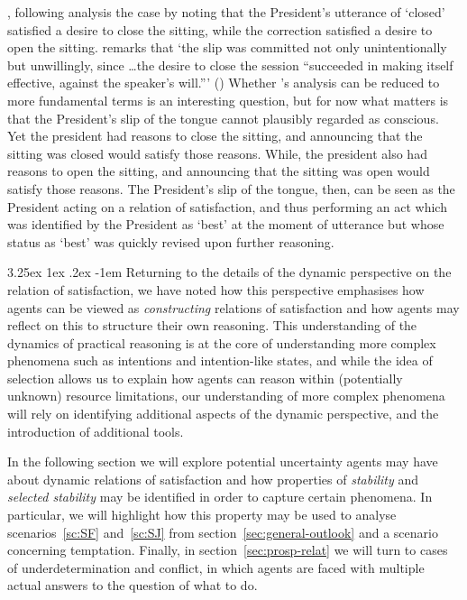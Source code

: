 \documentclass[10pt]{article}
\makeatletter
\renewcommand\paragraph{\@startsection{paragraph}{5}{\z@}%
  {3.25ex \@plus1ex \@minus.2ex}%
  {-1em}%
  {\normalfont\normalsize\bfseries}}
\makeatother
\begin{document}
\citeauthor{Velleman:2000aa}, following \citeauthor{Freud:1960aa} analysis the case by noting that the President's utterance of `closed' satisfied a desire to close the sitting, while the correction satisfied a desire to open the sitting.
\citeauthor{Freud:1960aa} remarks that `the slip was committed not only unintentionally but unwillingly, since \dots the desire to close the session ``succeeded in making itself effective, against the speaker’s will.'''
(\citeyear[3--4]{Velleman:2000aa})
Whether \citeauthor{Freud:1960aa}'s analysis can be reduced to more fundamental terms is an interesting question, but for now what matters is that the President's slip of the tongue cannot plausibly regarded as conscious.
Yet the president had reasons to close the sitting, and announcing that the sitting was closed would satisfy those reasons.
While, the president also had reasons to open the sitting, and announcing that the sitting was open would satisfy those reasons.
The President's slip of the tongue, then, can be seen as the President acting on a relation of satisfaction, and thus performing an act which was identified by the President as `best' at the moment of utterance but whose status as `best' was quickly revised upon further reasoning.

\paragraph{ } %
Returning to the details of the dynamic perspective on the relation of satisfaction, we have noted how this perspective emphasises how agents can be viewed as \emph{constructing} relations of satisfaction and how agents may reflect on this to structure their own reasoning.
This understanding of the dynamics of practical reasoning is at the core of understanding more complex phenomena such as intentions and intention-like states, and while the idea of selection allows us to explain how agents can reason within (potentially unknown) resource limitations, our understanding of more complex phenomena will rely on identifying additional aspects of the dynamic perspective, and the introduction of additional tools.

In the following section we will explore potential uncertainty agents may have about dynamic relations of satisfaction and how properties of \emph{stability} and \emph{selected stability} may be identified in order to capture certain phenomena.
In particular, we will highlight how this property may be used to analyse scenarios~\ref{sc:SF} and~\ref{sc:SJ} from section~\ref{sec:general-outlook} and a scenario concerning temptation.
Finally, in section~\ref{sec:prosp-relat} we will turn to cases of underdetermination and conflict, in which agents are faced with multiple actual answers to the question of what to do.
\end{document}
